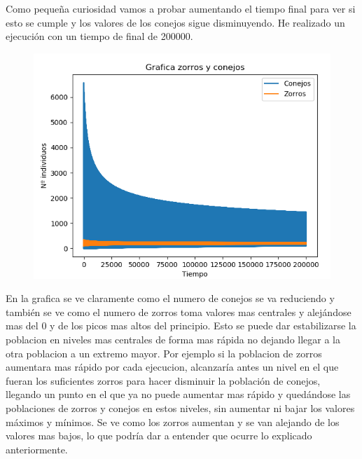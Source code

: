 \documentclass[]{article}
\begin{document}
Como pequeña curiosidad vamos a probar aumentando el tiempo final para ver si esto se cumple y los valores de los conejos sigue disminuyendo. He realizado un ejecución con un tiempo de final de 200000.
\begin{figure}[H]
	\centering
	\includegraphics[width=1\linewidth]{screenshot012}
	\caption{}
\end{figure}
En la grafica se ve claramente como el numero de conejos se va reduciendo y también se ve como el numero de zorros toma valores mas centrales y alejándose mas del 0 y de los picos mas altos del principio. Esto se puede dar estabilizarse la poblacion en niveles mas centrales de forma mas rápida no dejando llegar a la otra poblacion a un extremo mayor. Por ejemplo si la poblacion de zorros aumentara mas rápido por cada ejecucion, alcanzaría antes un nivel en el que fueran los suficientes zorros para hacer disminuir la población de conejos, llegando un punto en el que ya no puede aumentar mas rápido y quedándose las poblaciones de zorros y conejos en estos niveles, sin aumentar ni bajar los valores máximos y mínimos. Se ve como los zorros aumentan y se van alejando de los valores mas bajos, lo que podría dar a entender que ocurre lo explicado anteriormente.
\newpage
\end{document}
